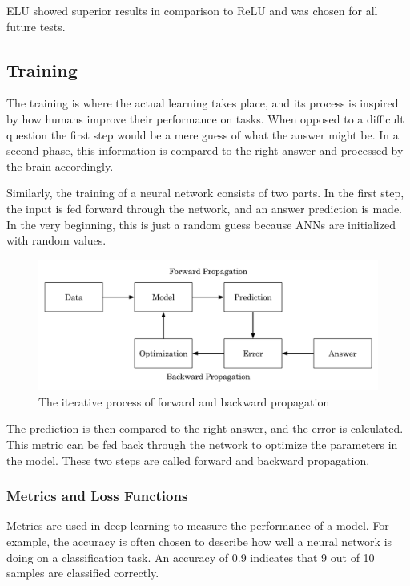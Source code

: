 ELU showed superior results in comparison to ReLU and was chosen for all future tests.

\subsection{Training}

The training is where the actual learning takes place, and its process is inspired by how humans improve their performance on tasks. When opposed to a difficult question the first step would be a mere guess of what the answer might be. In a second phase, this information is compared to the right answer and processed by the brain accordingly.

Similarly, the training of a neural network consists of two parts. In the first step, the input is fed forward through the network, and an answer prediction is made. In the very beginning, this is just a random guess because ANNs are initialized with random values. 

\begin{figure}[H]
\centering
\par
\includegraphics[width=1.0\textwidth]{imgs/forward_backward_prop.png}
\caption{The iterative process of forward and backward propagation}
\par
\end{figure}

The prediction is then compared to the right answer, and the error is calculated. This metric can be fed back through the network to optimize the parameters in the model. These two steps are called forward and backward propagation.

\subsubsection{Metrics and Loss Functions}

Metrics are used in deep learning to measure the performance of a model. For example, the accuracy is often chosen to describe how well a neural network is doing on a classification task. An accuracy of 0.9 indicates that 9 out of 10 samples are classified correctly.

